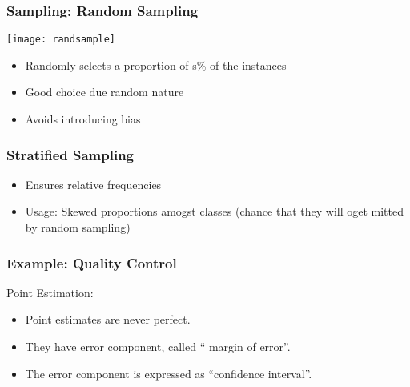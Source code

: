 \begin{frame}[fragile] \frametitle{Sampling: Random Sampling}

\begin{center}
\texttt{[image: randsample]}
\end{center}

\begin{itemize}
\item Randomly selects a proportion of s\% of the instances 
\item Good choice due random nature
\item Avoids introducing bias 
\end{itemize}

\end{frame}


\begin{frame}[fragile]\frametitle{Stratified Sampling}	
	\begin{itemize}
	\item Ensures relative frequencies
	\item Usage: Skewed proportions amogst classes (chance that they will oget mitted by random sampling)
	\end{itemize}

\end{frame}

%


\begin{frame}[fragile]\frametitle{Example: Quality Control}
Point Estimation:
\begin{itemize}
\item Point estimates are never perfect.
\item They have error component, called `` margin of error''.
\item The error component is expressed as ``confidence interval''.
\end{itemize}
\end{frame}


